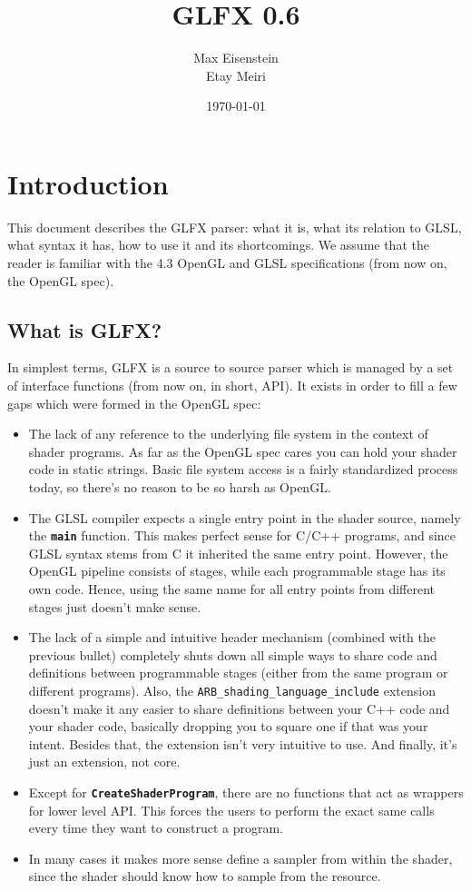 \documentclass[11pt,a4paper,final,titlepage]{article}
\begin{document}
\title{GLFX 0.6}
\author{Max Eisenstein\\Etay Meiri}
\date{\today}
\maketitle

\listoffixmes

\tableofcontents

\pagebreak

\section{Introduction}\label{sec:intro}
This document describes the GLFX parser: what it is, what its relation to GLSL,
what syntax it has, how to use it and its shortcomings. We assume that the reader is familiar with the
4.3 OpenGL and GLSL specifications (from now on, the OpenGL spec).

\subsection{What is GLFX?}
In simplest terms, GLFX is a source to source parser which is managed by a set of interface functions
(from now on, in short, API).
It exists in order to fill a few gaps which were formed in the OpenGL spec:
\begin{itemize}
\item The lack of any reference to the underlying file system in the context of shader programs.
As far as the OpenGL spec cares you can hold your shader code in static strings. Basic file system access
is a fairly standardized process today, so there's no reason to be so harsh as OpenGL.
\item The GLSL compiler expects a single entry point in the shader source, namely the
{\texttt{\textbf{main}}} function. This makes perfect sense for C/C++ programs, and since
GLSL syntax stems from C it inherited the same entry point. However, the OpenGL
pipeline consists of stages, while each programmable stage has its own code.
Hence, using the same name for all entry points from different stages just doesn't make sense.
\item The lack of a simple and intuitive header mechanism (combined with the previous bullet) completely
shuts down all simple ways to share code and definitions between programmable stages
(either from the same program or different programs).
Also, the \texttt{ARB\_\-shading\_\-language\_\-include} extension doesn't make
it any easier to share definitions between your C++ code and your shader code, basically dropping
you to square one if that was your intent.
Besides that, the extension isn't very intuitive to use. And finally, it's just an extension, not core.
\item Except for \texttt{\textbf{Create\-Shader\-Program}}, there are no functions that act as
wrappers for lower level API.
This forces the users to perform the exact same calls every time they want to construct a program.
\item In many cases it makes more sense define a sampler from within the shader, since the shader
should know how to sample from the resource.
\end{itemize}
\end{document}
